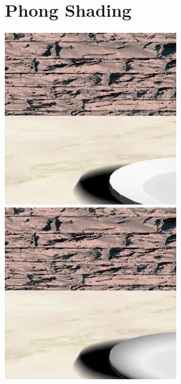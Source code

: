 \documentclass{article}
\begin{document}
\section{Phong Shading}
\includegraphics[width=3in]{Assets/no_phong.png}
\includegraphics[width=3in]{Assets/phong.png}

\newpage
\end{document}
